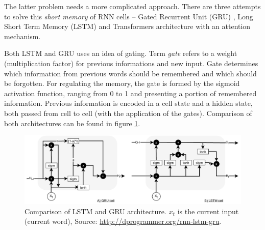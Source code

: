 The latter problem needs a more complicated approach. There are three attempts to solve this \textit{short memory} of RNN cells -- Gated Recurrent Unit (GRU) \citep{Cho2014}, Long Short Term Memory (LSTM) \citep{Hochreiter1997} and Transformers architecture \citep{Vaswani2017} with an attention mechanism.
\par
Both LSTM and GRU uses an idea of gating. Term \textit{gate} refers to a weight (multiplication factor) for previous informations and new input. Gate determines which information from previous words should be remembered and which should be forgotten. For regulating the memory, the gate is formed by the sigmoid activation function, ranging from 0 to 1 and presenting a portion of remembered information. Previous information is encoded in a cell state and a hidden state, both passed from cell to cell (with the application of the gates). Comparison of both architectures can be found in figure \ref{pic:lstm_gru}.

\begin{figure}[H]
\centering
\includegraphics[width=1\columnwidth]{../img/rnn_lstm_gru}
\protect\caption[A comparison of LSTM and GRU architectures]{Comparison of LSTM and GRU architecture. $x_t$ is the current input (current word),  Source: \url{http://dprogrammer.org/rnn-lstm-gru}.}
\label{pic:lstm_gru}
\end{figure}
